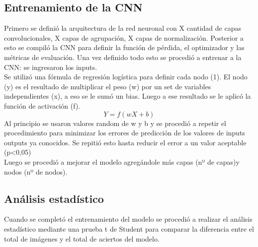 \subsection{Entrenamiento de la CNN}
Primero se definió la arquitectura de la red neuronal con X cantidad de capas convolucionales, X capas de
agrupación, X capas de normalización. Posterior a esto se compiló la CNN para definir la función de pérdida,
el optimizador y las métricas de evaluación. Una vez definido todo esto se procedió a entrenar a la CNN:
se ingresaron los inputs. \\
Se utilizó una fórmula de regresión logística para definir cada nodo (1). El nodo (y) es el resultado de
multiplicar el peso (w) por un set de variables independientes (x), a eso se le sumó un bias. Luego a ese
resultado se le aplicó la función de activación (f).
\begin{equation}
    Y = f (wX+ b)
\end{equation}
Al principio se usaron valores random de w y b y se procedió a repetir el procedimiento para minimizar los
errores de predicción de los valores de inputs  outputs ya conocidos. Se repitió esto hasta reducir el error
a un valor aceptable (p<0,05)\\
Luego se procedió a mejorar el modelo agregándole más capas (nº de capas)y nodos (nº de nodos).\\

\subsection{Análisis estadístico}
Cuando se completó el entrenamiento del modelo se procedió a realizar el análisis estadístico mediante una
prueba t de Student para comparar la diferencia entre el total de imágenes y el total de aciertos del modelo.